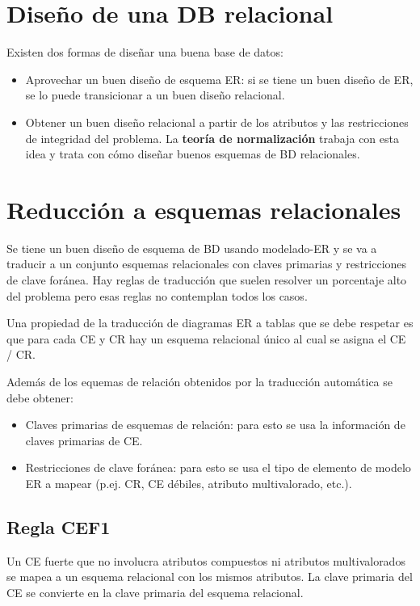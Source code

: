 \documentclass[12pt,a4paper]{report}
\begin{document}
	\section{Diseño de una DB relacional}
		\par Existen dos formas de diseñar una buena base de datos:
		\begin{itemize}
			\item Aprovechar un buen diseño de esquema ER: si se tiene un buen diseño de ER, se lo puede transicionar a un buen diseño relacional. 
			\item Obtener un buen diseño relacional a partir de los atributos y las restricciones de integridad del problema. La \textbf{teoría de normalización} trabaja con esta idea y trata con cómo diseñar buenos esquemas de BD relacionales.
		\end{itemize}
	
	\section{Reducción a esquemas relacionales}
		\par Se tiene un buen diseño de esquema de BD usando modelado-ER y se va a 
traducir a un conjunto esquemas relacionales con claves primarias y restricciones de clave foránea. Hay reglas de traducción que suelen resolver un porcentaje alto del problema pero esas reglas no contemplan todos los casos.

		\par Una propiedad de la traducción de diagramas ER a tablas que se debe respetar es que para cada CE y CR hay un esquema relacional único al cual se asigna el CE / CR.
		
		\vspace{5mm}		
		\par Además de los equemas de relación obtenidos por la traducción automática se debe obtener:
		\begin{itemize}
			\item Claves primarias de esquemas de relación: para esto se usa la información de claves primarias de CE.
			\item Restricciones de clave foránea: para esto se usa el tipo de elemento de modelo ER a mapear (p.ej. CR, CE débiles, atributo multivalorado, etc.).
		\end{itemize}

		\subsection{Regla CEF1}
			\par Un CE fuerte que no involucra atributos compuestos ni atributos multivalorados se mapea a un esquema relacional con los mismos atributos. La clave primaria del CE se convierte en la clave primaria del esquema relacional.
\end{document}
